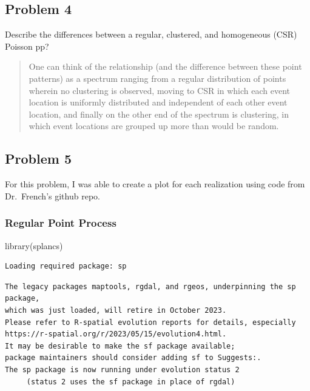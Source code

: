 \documentclass[
  letterpaper,
  DIV=11,
  numbers=noendperiod]{scrartcl}
\newenvironment{Shaded}{\begin{snugshade}}{\end{snugshade}}
\newcommand{\FunctionTok}[1]{\textcolor[rgb]{0.28,0.35,0.67}{#1}}
\newcommand{\NormalTok}[1]{\textcolor[rgb]{0.00,0.23,0.31}{#1}}
\begin{document}
\hypertarget{problem-4}{%
\subsection{Problem 4}\label{problem-4}}

Describe the differences between a regular, clustered, and homogeneous
(CSR) Poisson pp?

\begin{quote}
One can think of the relationship (and the difference between these
point patterns) as a spectrum ranging from a regular distribution of
points wherein no clustering is observed, moving to CSR in which each
event location is uniformly distributed and independent of each other
event location, and finally on the other end of the spectrum is
clustering, in which event locations are grouped up more than would be
random.
\end{quote}

\hypertarget{problem-5}{%
\subsection{Problem 5}\label{problem-5}}

For this problem, I was able to create a plot for each realization using
code from Dr.~French's github repo.

\hypertarget{regular-point-process}{%
\subsubsection{Regular Point Process}\label{regular-point-process}}

\begin{Shaded}
\begin{Highlighting}[]
\FunctionTok{library}\NormalTok{(splancs)}
\end{Highlighting}
\end{Shaded}

\begin{verbatim}
Loading required package: sp
\end{verbatim}

\begin{verbatim}
The legacy packages maptools, rgdal, and rgeos, underpinning the sp package,
which was just loaded, will retire in October 2023.
Please refer to R-spatial evolution reports for details, especially
https://r-spatial.org/r/2023/05/15/evolution4.html.
It may be desirable to make the sf package available;
package maintainers should consider adding sf to Suggests:.
The sp package is now running under evolution status 2
     (status 2 uses the sf package in place of rgdal)
\end{verbatim}
\end{document}
